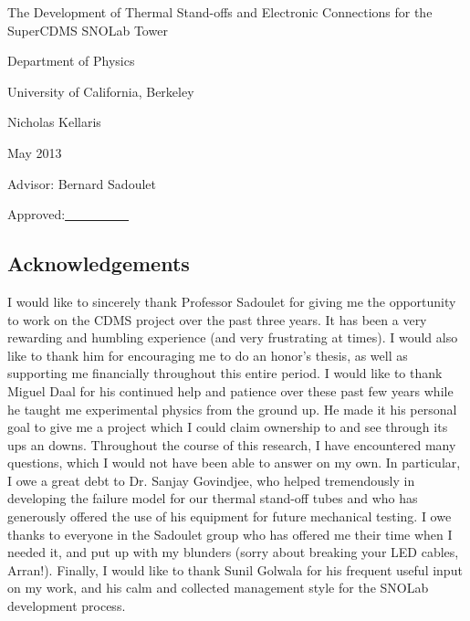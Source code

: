 \documentclass{report}
\begin{document}


\begin{titlepage}
\null\vfill
\begin{center}{\Large The Development of Thermal Stand-offs and Electronic Connections for the SuperCDMS SNOLab Tower}\par\vskip1cm
Department of Physics\par
University of California, Berkeley\par
\vskip1cm
Nicholas Kellaris \par
May 2013\par
\vskip1cm
Advisor: Bernard Sadoulet\par
\vskip0.5cm
Approved:\underline{\ \ \ \ \ \ \ \ \qquad \qquad \qquad \ \ }



\end{center}\vfill


\end{titlepage}

\tableofcontents

\begin{center}\section*{Acknowledgements}\end{center}

I would like to sincerely thank Professor Sadoulet for giving me the opportunity to work on the CDMS project over the past three years. It has been a very rewarding and humbling experience (and very frustrating at times). I would also like to thank him for encouraging me to do an honor's thesis, as well as supporting me financially throughout this entire period. I would like to thank Miguel Daal for his continued help and patience over these past few years while he taught me experimental physics from the ground up. He made it his personal goal to give me a project which I could claim ownership to and see through its ups an downs. Throughout the course of this research, I have encountered many questions, which I would not have been able to answer on my own. In particular, I owe a great debt to Dr. Sanjay Govindjee, who helped tremendously in developing the failure model for our thermal stand-off tubes and who has generously offered the use of his equipment for future mechanical testing. I owe thanks to everyone in the Sadoulet group who has offered me their time when I needed it, and put up with my blunders (sorry about breaking your LED cables, Arran!). Finally, I would like to thank Sunil Golwala for his frequent useful input on my work, and his calm and collected management style for the SNOLab development process.
\end{document}
